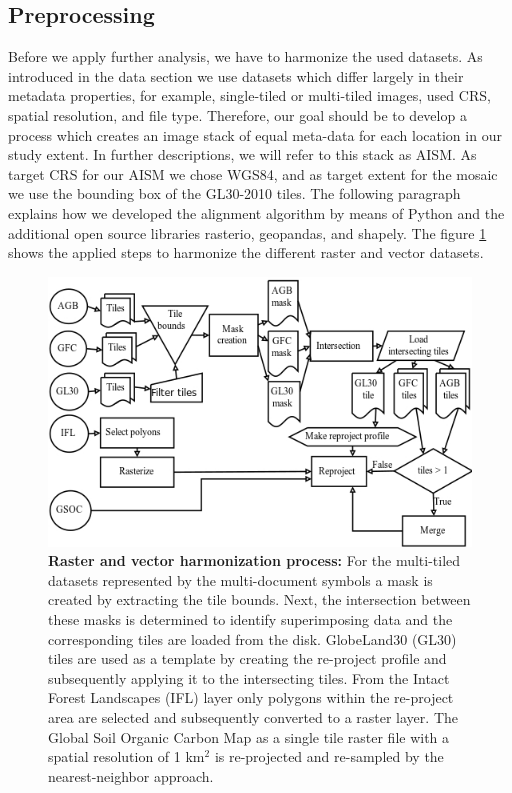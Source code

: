 	\subsection{Preprocessing}
		Before we apply further analysis, we have to harmonize the used datasets. As introduced in the data section we use datasets which differ largely in their metadata properties, for example, single-tiled or multi-tiled images, used \ac{CRS}, spatial resolution, and file type. Therefore, our goal should be to develop a process which creates an image stack of equal meta-data for each location in our study extent. In further descriptions, we will refer to this stack as \ac{AISM}. As target \ac{CRS} for our \ac{AISM} we chose \ac{WGS84}, and as target extent for the mosaic we use the bounding box of the \ac{GL30}-2010 tiles. The following paragraph explains how we developed the alignment algorithm by means of Python and the additional open source libraries rasterio, geopandas, and shapely. The figure \ref{fig:preprocessing_flowchart} shows the applied steps to harmonize the different raster and vector datasets.
		\begin{figure}[ht]
			\centering
			\includegraphics[scale=.97]{img/align}
			\caption[Raster and vector harmonization process]{\textbf{Raster and vector harmonization process:} For the multi-tiled datasets represented by the multi-document symbols a mask is created by extracting the tile bounds. Next, the intersection between these masks is determined to identify superimposing data and the corresponding tiles are loaded from the disk. GlobeLand30 (GL30) tiles are used as a template by creating the re-project profile and subsequently applying it to the intersecting tiles. From the Intact Forest Landscapes (IFL) layer only polygons within the re-project area are selected and subsequently converted to a raster layer. The Global Soil Organic Carbon Map as a single tile raster file with a spatial resolution of 1 km$^2$ is re-projected and re-sampled by the nearest-neighbor approach.}
			\label{fig:preprocessing_flowchart}
		\end{figure}

